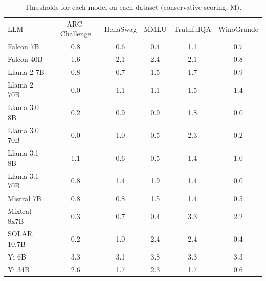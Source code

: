 \begin{table}[h]
\caption{Thresholds for each model on each dataset (conservative scoring, M). }
\label{tab:thresholds_logit_margin_k20_w2}
\centering
\begin{tabular}{l S[table-format=3.1] S[table-format=3.1] S[table-format=3.1] S[table-format=3.1] S[table-format=3.1]}
\toprule
LLM & ARC-Challenge & HellaSwag & MMLU & TruthfulQA & WinoGrande \\ 
\cmidrule(lr){1-1} \cmidrule(lr){2-2} \cmidrule(lr){3-3} \cmidrule(lr){4-4} \cmidrule(lr){5-5} \cmidrule(lr){6-6}
Falcon 7B & 0.8 & 0.6 & 0.4 & 1.1 & 0.7\\
Falcon 40B & 1.6 & 2.1 & 2.4 & 2.1 & 0.8\\
Llama 2 7B & 0.8 & 0.7 & 1.5 & 1.7 & 0.9\\
Llama 2 70B & 0.0 & 1.1 & 1.1 & 1.5 & 1.4\\
Llama 3.0 8B & 0.2 & 0.9 & 0.9 & 1.8 & 0.0\\
Llama 3.0 70B & 0.0 & 1.0 & 0.5 & 2.3 & 0.2\\
Llama 3.1 8B & 1.1 & 0.6 & 0.5 & 1.4 & 1.0\\
Llama 3.1 70B & 0.8 & 1.4 & 1.9 & 1.4 & 0.0\\
Mistral 7B & 0.8 & 0.8 & 1.5 & 1.4 & 0.5\\
Mixtral 8x7B & 0.3 & 0.7 & 0.4 & 3.3 & 2.2\\
SOLAR 10.7B & 0.2 & 1.0 & 2.4 & 2.4 & 0.4\\
Yi 6B & 3.3 & 3.1 & 3.8 & 3.3 & 3.3\\
Yi 34B & 2.6 & 1.7 & 2.3 & 1.7 & 0.6\\
\bottomrule
\end{tabular}
\end{table}
